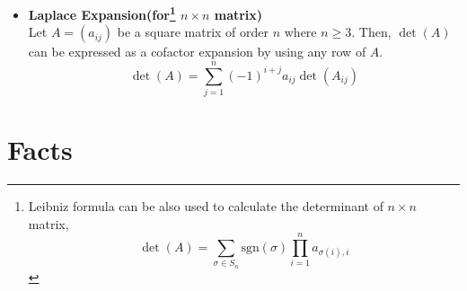 \documentclass[12pt]{article}
\theoremstyle{definition}
\theoremstyle{remark}
\begin{document}
\begin{itemize}
\item \textbf{Laplace Expansion(for\footnote{Leibniz formula can be also used to calculate the determinant of $n\times n$ matrix, $$\det(A)=\sum_{\sigma\in S_n}\text{sgn}(\sigma)\prod_{i=1}^{n}a_{\sigma(i),i}$$} $n\times n$ matrix)}\\
Let $A=(a_{ij})$ be a square matrix of order $n$ where $n\geq 3.$ Then, $\det(A)$ can be expressed as a cofactor expansion by using any row of $A$.
\begin{equation}
\det(A)= \sum_{j=1}^n (-1)^{i+j} a_{ij} \det(A_{ij})
\end{equation}
\end{itemize}
\section{Facts}
\end{document}
